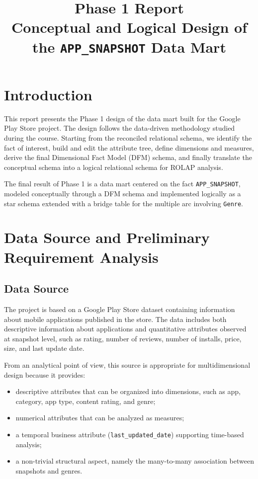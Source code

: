 \documentclass[11pt,a4paper]{article}
\title{Phase 1 Report\\Conceptual and Logical Design of the \texttt{APP\_SNAPSHOT} Data Mart}
\author{}
\date{}
\begin{document}
\maketitle

\section{Introduction}
This report presents the Phase 1 design of the data mart built for the Google Play Store project. The design follows the data-driven methodology studied during the course. Starting from the reconciled relational schema, we identify the fact of interest, build and edit the attribute tree, define dimensions and measures, derive the final Dimensional Fact Model (DFM) schema, and finally translate the conceptual schema into a logical relational schema for ROLAP analysis.

The final result of Phase 1 is a data mart centered on the fact \texttt{APP\_SNAPSHOT}, modeled conceptually through a DFM schema and implemented logically as a star schema extended with a bridge table for the multiple arc involving \texttt{Genre}.

\section{Data Source and Preliminary Requirement Analysis}

\subsection{Data Source}
The project is based on a Google Play Store dataset containing information about mobile applications published in the store. The data includes both descriptive information about applications and quantitative attributes observed at snapshot level, such as rating, number of reviews, number of installs, price, size, and last update date.

From an analytical point of view, this source is appropriate for multidimensional design because it provides:
\begin{itemize}[leftmargin=1.5em]
    \item descriptive attributes that can be organized into dimensions, such as app, category, app type, content rating, and genre;
    \item numerical attributes that can be analyzed as measures;
    \item a temporal business attribute (\texttt{last\_updated\_date}) supporting time-based analysis;
    \item a non-trivial structural aspect, namely the many-to-many association between snapshots and genres.
\end{itemize}
\end{document}
